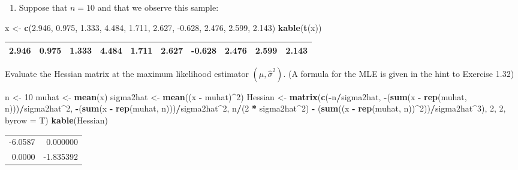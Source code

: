 \documentclass[12pt,]{article}
\newenvironment{Shaded}{\begin{snugshade}}{\end{snugshade}}
\newcommand{\DataTypeTok}[1]{\textcolor[rgb]{0.13,0.29,0.53}{#1}}
\newcommand{\DecValTok}[1]{\textcolor[rgb]{0.00,0.00,0.81}{#1}}
\newcommand{\FloatTok}[1]{\textcolor[rgb]{0.00,0.00,0.81}{#1}}
\newcommand{\KeywordTok}[1]{\textcolor[rgb]{0.13,0.29,0.53}{\textbf{#1}}}
\newcommand{\NormalTok}[1]{#1}
\newcommand{\OperatorTok}[1]{\textcolor[rgb]{0.81,0.36,0.00}{\textbf{#1}}}
\newcommand{\StringTok}[1]{\textcolor[rgb]{0.31,0.60,0.02}{#1}}
\providecommand{\tightlist}{%
  \setlength{\itemsep}{0pt}\setlength{\parskip}{0pt}}
\begin{document}
\begin{enumerate}
\def\labelenumi{\alph{enumi}.}
\setcounter{enumi}{1}
\tightlist
\item
  Suppose that \(n = 10\) and that we observe this sample:
\end{enumerate}

\begin{Shaded}
\begin{Highlighting}[]
\NormalTok{x <-}\StringTok{ }\KeywordTok{c}\NormalTok{(}\FloatTok{2.946}\NormalTok{, }\FloatTok{0.975}\NormalTok{, }\FloatTok{1.333}\NormalTok{, }\FloatTok{4.484}\NormalTok{, }\FloatTok{1.711}\NormalTok{, }\FloatTok{2.627}\NormalTok{, }\FloatTok{-0.628}\NormalTok{, }
    \FloatTok{2.476}\NormalTok{, }\FloatTok{2.599}\NormalTok{, }\FloatTok{2.143}\NormalTok{)}
\KeywordTok{kable}\NormalTok{(}\KeywordTok{t}\NormalTok{(x))}
\end{Highlighting}
\end{Shaded}

\begin{longtable}[]{@{}rrrrrrrrrr@{}}
\toprule
\endhead
2.946 & 0.975 & 1.333 & 4.484 & 1.711 & 2.627 & -0.628 & 2.476 & 2.599 &
2.143\tabularnewline
\bottomrule
\end{longtable}

Evaluate the Hessian matrix at the maximum likelihood estimator
\((\hat{\mu}, \hat{\sigma}^2)\). (A formula for the MLE is given in the
hint to Exercise 1.32)

\begin{Shaded}
\begin{Highlighting}[]
\NormalTok{n <-}\StringTok{ }\DecValTok{10}
\NormalTok{muhat <-}\StringTok{ }\KeywordTok{mean}\NormalTok{(x)}
\NormalTok{sigma2hat <-}\StringTok{ }\KeywordTok{mean}\NormalTok{((x }\OperatorTok{-}\StringTok{ }\NormalTok{muhat)}\OperatorTok{^}\DecValTok{2}\NormalTok{)}
\NormalTok{Hessian <-}\StringTok{ }\KeywordTok{matrix}\NormalTok{(}\KeywordTok{c}\NormalTok{(}\OperatorTok{-}\NormalTok{n}\OperatorTok{/}\NormalTok{sigma2hat, }\OperatorTok{-}\NormalTok{(}\KeywordTok{sum}\NormalTok{(x }\OperatorTok{-}\StringTok{ }\KeywordTok{rep}\NormalTok{(muhat, }
\NormalTok{    n)))}\OperatorTok{/}\NormalTok{sigma2hat}\OperatorTok{^}\DecValTok{2}\NormalTok{, }\OperatorTok{-}\NormalTok{(}\KeywordTok{sum}\NormalTok{(x }\OperatorTok{-}\StringTok{ }\KeywordTok{rep}\NormalTok{(muhat, n)))}\OperatorTok{/}\NormalTok{sigma2hat}\OperatorTok{^}\DecValTok{2}\NormalTok{, }
\NormalTok{    n}\OperatorTok{/}\NormalTok{(}\DecValTok{2} \OperatorTok{*}\StringTok{ }\NormalTok{sigma2hat}\OperatorTok{^}\DecValTok{2}\NormalTok{) }\OperatorTok{-}\StringTok{ }\NormalTok{(}\KeywordTok{sum}\NormalTok{((x }\OperatorTok{-}\StringTok{ }\KeywordTok{rep}\NormalTok{(muhat, n))}\OperatorTok{^}\DecValTok{2}\NormalTok{))}\OperatorTok{/}\NormalTok{sigma2hat}\OperatorTok{^}\DecValTok{3}\NormalTok{), }
    \DecValTok{2}\NormalTok{, }\DecValTok{2}\NormalTok{, }\DataTypeTok{byrow =}\NormalTok{ T)}
\KeywordTok{kable}\NormalTok{(Hessian)}
\end{Highlighting}
\end{Shaded}

\begin{longtable}[]{@{}rr@{}}
\toprule
\endhead
-6.0587 & 0.000000\tabularnewline
0.0000 & -1.835392\tabularnewline
\bottomrule
\end{longtable}
\end{document}
